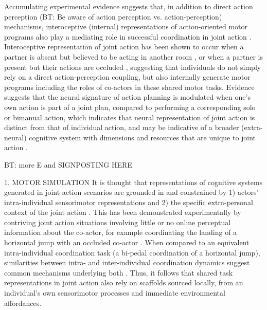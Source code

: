 \begin{CJK}{UTF8}{gbsn}
{%

Accumulating experimental evidence suggests that, in addition to direct action perception (BT: Be aware of action perception vs. action-perception) mechanisms, interoceptive (internal) representations of action-oriented motor programs also play a mediating role in successful coordination in joint action \citep{Moreau2016}.  Interoceptive representation of joint action has been shown to occur when a partner is absent but believed to be acting in another room \citep{Milward2014}, or when a partner is present but their actions are occluded \citep{Atmaca2011}, suggesting that individuals do not simply rely on a direct action-perception coupling, but also internally generate motor programs including the roles of co-actors in these shared motor tasks.
Evidence suggests that the neural signature of action planning is modulated when one's own action is part of a joint plan, compared to performing a corresponding solo or bimanual action, which indicates that neural representation of joint action is distinct from that of individual action, and may be indicative of a broader (extra-neural) cognitive system with dimensions and resources that are unique to joint action \citep{Kourtis2014}.


BT: more E and SIGNPOSTING HERE

1. MOTOR SIMULATION
It is thought that representations of cognitive systems generated in joint action scenarios are grounded in and constrained by 1) actors' intra-individual sensorimotor representations and 2) the specific extra-personal context of the joint action \citep{Sebanz2006}.  This has been demonstrated experimentally by contriving joint action situations involving little or no online perceptual information about the co-actor, for example coordinating the landing of a horizontal jump with an occluded co-actor \citep{Vesper2012}. When compared to an equivalent intra-individual coordination task (a bi-pedal coordination of a horizontal jump), similarities between intra- and inter-individual coordination dynamics suggest common mechanisms underlying both \citep{Schmidt2008}.  Thus, it follows that shared task representations in joint action also rely on scaffolds sourced locally, from an individual's own sensorimotor processes and immediate environmental affordances\citep{Williams2009}.


}
\end{CJK}
